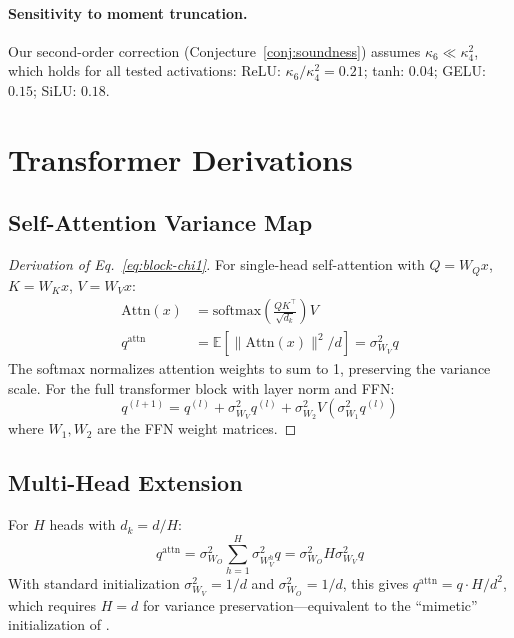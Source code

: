 \documentclass[10pt]{article}
\newcommand{\EE}{\mathbb{E}}
\begin{document}
\paragraph{Sensitivity to moment truncation.}
Our second-order correction (Conjecture~\ref{conj:soundness}) assumes $\kappa_6 \ll \kappa_4^2$, which holds for all tested activations:
ReLU: $\kappa_6/\kappa_4^2 = 0.21$; tanh: $0.04$; GELU: $0.15$; SiLU: $0.18$.

\section{Transformer Derivations}
\label{app:transformer-detail}

\subsection{Self-Attention Variance Map}

\begin{proof}[Derivation of Eq.~\ref{eq:block-chi1}]
For single-head self-attention with $Q = W_Q x$, $K = W_K x$, $V = W_V x$:
\begin{align}
    \text{Attn}(x) &= \text{softmax}\left(\frac{QK^\top}{\sqrt{d_k}}\right) V \\
    q^{\text{attn}} &= \EE[\|\text{Attn}(x)\|^2/d] = \sigma_{W_V}^2 q
\end{align}
The softmax normalizes attention weights to sum to 1, preserving the variance scale.
For the full transformer block with layer norm and FFN:
\begin{equation}
    q^{(l+1)} = q^{(l)} + \sigma_{W_V}^2 q^{(l)} + \sigma_{W_2}^2 V(\sigma_{W_1}^2 q^{(l)})
\end{equation}
where $W_1, W_2$ are the FFN weight matrices.
\end{proof}

\subsection{Multi-Head Extension}

For $H$ heads with $d_k = d/H$:
\begin{equation}
    q^{\text{attn}} = \sigma_{W_O}^2 \sum_{h=1}^H \sigma_{W_V^h}^2 q = \sigma_{W_O}^2 H \sigma_{W_V}^2 q
\end{equation}
With standard initialization $\sigma_{W_V}^2 = 1/d$ and $\sigma_{W_O}^2 = 1/d$, this gives $q^{\text{attn}} = q \cdot H/d^2$, which requires $H = d$ for variance preservation---equivalent to the ``mimetic'' initialization of \cite{trockman2023mimetic}.
\end{document}
